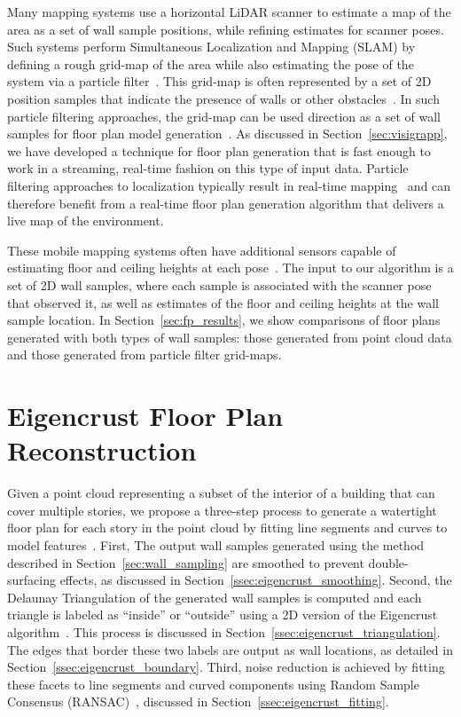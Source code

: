 \documentclass[12pt,onecolumn,oneside]{book}
\begin{document}
Many mapping systems use a horizontal LiDAR scanner to estimate a map of the area as a set of wall sample positions, while refining estimates for scanner poses.  Such systems perform Simultaneous Localization and Mapping (SLAM) by defining a rough grid-map of the area while also estimating the pose of the system via a particle filter~\cite{NickJournal,Quadrotor}.  This grid-map is often represented by a set of 2D position samples that indicate the presence of walls or other obstacles~\cite{ProbabilisticRobotics}.  In such particle filtering approaches, the grid-map can be used direction as a set of wall samples for floor plan model generation~\cite{Turner14}.  As discussed in Section~\ref{sec:visigrapp}, we have developed a technique for floor plan generation that is fast enough to work in a streaming, real-time fashion on this type of input data.  Particle filtering approaches to localization typically result in real-time mapping~\cite{fastslam03,toro07} and can therefore benefit from a real-time floor plan generation algorithm that delivers a live map of the environment. 

These mobile mapping systems often have additional sensors capable of estimating floor and ceiling heights at each pose~\cite{Backpack,Quadrotor}.  The input to our algorithm is a set of 2D wall samples, where each sample is associated with the scanner pose that observed it, as well as estimates of the floor and ceiling heights at the wall sample location.  In Section~\ref{sec:fp_results}, we show comparisons of floor plans generated with both types of wall samples:  those generated from point cloud data and those generated from particle filter grid-maps.

\section{Eigencrust Floor Plan Reconstruction}
\label{sec:eigencrust}

Given a point cloud representing a subset of the interior of a building that can cover multiple stories, we propose a three-step process to generate a watertight floor plan for each story in the point cloud by fitting line segments and curves to model features~\cite{Turner12}.  First, The output wall samples generated using the method described in Section~\ref{sec:wall_sampling} are smoothed to prevent double-surfacing effects, as discussed in Section~\ref{ssec:eigencrust_smoothing}.  Second, the Delaunay Triangulation of the generated wall samples is computed and each triangle is labeled as ``inside'' or ``outside'' using a 2D version of the Eigencrust algorithm~\cite{EigencrustShewchuk}.  This process is discussed in Section~\ref{ssec:eigencrust_triangulation}.  The edges that border these two labels are output as wall locations, as detailed in Section~\ref{ssec:eigencrust_boundary}.  Third, noise reduction is achieved by fitting these facets to line segments and curved components using Random Sample Consensus (RANSAC)~\cite{Ransac}, discussed in Section~\ref{ssec:eigencrust_fitting}.
\end{document}
